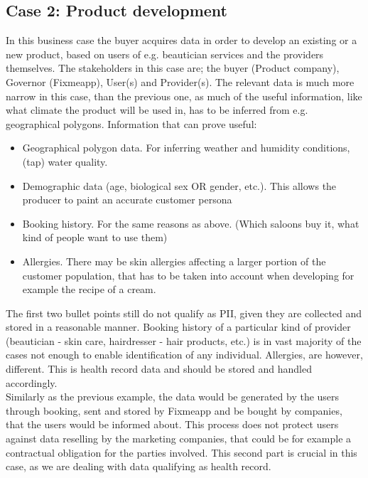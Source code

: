 \documentclass[a4paper,11pt]{report} %
\theoremstyle{change}
\theoremstyle{theoremstyle}
\begin{document}
\subsection{Case 2: Product development}
In this business case the buyer acquires data in order to develop an existing or a new product, based on users of e.g. 
beautician services and the providers themselves. The stakeholders in this case are; the buyer (Product company), Governor (Fixmeapp), User(s) and Provider(s). The relevant data is much more narrow in this case, than the previous one, as much of the useful information, like what climate the product will be used in, has to be inferred from e.g. geographical polygons. Information that can prove useful:
\begin{itemize}
    \item Geographical polygon data. For inferring weather and humidity conditions, (tap) water quality.
    \item Demographic data (age, biological sex OR gender, etc.). This allows the producer to paint an accurate customer persona
    \item Booking history. For the same reasons as above. (Which saloons buy it, what kind of people want to use them)
    \item Allergies. There may be skin allergies affecting a larger portion of the customer population, that has to be taken into account when developing for example the recipe of a cream.
\end{itemize}
The first two bullet points still do not qualify as PII, given they are collected and stored in a reasonable manner. Booking history of a particular kind of provider (beautician - skin care, hairdresser - hair products, etc.) is in vast majority of the cases not enough to enable identification of any individual. Allergies, are however, different. This is health record data and should be stored and handled accordingly. \\
Similarly as the previous example, the data would be generated by the users through booking, sent and stored by Fixmeapp and be bought by companies, that the users would be informed about. This process does not protect users against data reselling by the marketing companies, that could be for example a contractual obligation for the parties involved. This second part is crucial in this case, as we are dealing with data qualifying as health record.\\
\end{document}
